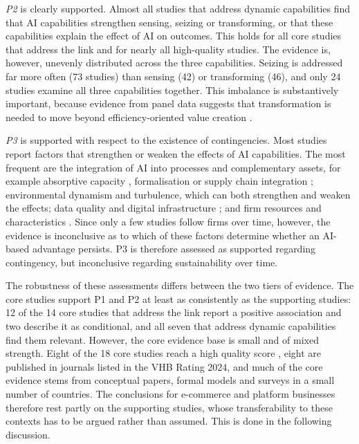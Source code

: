 \emph{P2} is clearly supported. Almost all studies that address dynamic capabilities find that AI capabilities strengthen sensing, seizing or transforming, or that these capabilities explain the effect of AI on outcomes. This holds for all core studies that address the link and for nearly all high-quality studies. The evidence is, however, unevenly distributed across the three capabilities. Seizing is addressed far more often (73 studies) than sensing (42) or transforming (46), and only 24 studies examine all three capabilities together. This imbalance is substantively important, because evidence from panel data suggests that transformation is needed to move beyond efficiency-oriented value creation \parencite[1]{huang2026}.

\emph{P3} is supported with respect to the existence of contingencies. Most studies report factors that strengthen or weaken the effects of AI capabilities. The most frequent are the integration of AI into processes and complementary assets, for example absorptive capacity \parencite[1]{slrR017}, formalisation \parencite[1]{slrR022} or supply chain integration \parencites[1]{slrR083}[1]{slrR098}; environmental dynamism and turbulence, which can both strengthen \parencite[3003]{slrR056} and weaken \parencites[10]{li2025}[1]{slrR037} the effects; data quality and digital infrastructure \parencites[1]{slrR050}[1]{slrR111}; and firm resources and characteristics \parencites[1]{slrR077}[1]{liang2026}. Since only a few studies follow firms over time, however, the evidence is inconclusive as to which of these factors determine whether an AI-based advantage persists. P3 is therefore assessed as supported regarding contingency, but inconclusive regarding sustainability over time.

The robustness of these assessments differs between the two tiers of evidence. The core studies support P1 and P2 at least as consistently as the supporting studies: 12 of the 14 core studies that address the link report a positive association and two describe it as conditional, and all seven that address dynamic capabilities find them relevant. However, the core evidence base is small and of mixed strength. Eight of the 18 core studies reach a high quality score \parencites[1]{chen2022}[1250]{slrR216}[1246]{slrR269}[187]{chen2026}, eight are published in journals listed in the VHB Rating 2024, and much of the core evidence stems from conceptual papers, formal models and surveys in a small number of countries. The conclusions for e-commerce and platform businesses therefore rest partly on the supporting studies, whose transferability to these contexts has to be argued rather than assumed. This is done in the following discussion.

